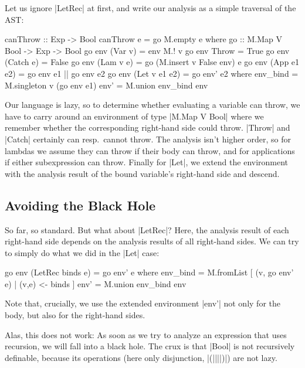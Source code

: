 \documentclass[manuscript,screen,acmsmall,nonacm]{acmart}
\begin{document}
Let us ignore |LetRec| at first, and write our analysis as a simple traversal of the AST:
\savecolumns
\begin{code}
canThrow :: Exp -> Bool
canThrow e = go M.empty e
  where
    go :: M.Map V Bool -> Exp -> Bool
    go env (Var v)        = env M.! v
    go env Throw          = True
    go env (Catch e)      = False
    go env (Lam v e)      = go (M.insert v False env) e
    go env (App e1 e2)    = go env e1 || go env e2
    go env (Let v e1 e2)  = go env' e2
      where
        env_bind  = M.singleton v (go env e1)
        env'      = M.union env_bind env
\end{code}

Our language is lazy, so to determine whether evaluating a variable can throw,
we have to carry around an
environment of type |M.Map V Bool| where we remember whether the corresponding right-hand side could throw. |Throw| and |Catch| certainly can resp.\ cannot throw. The analysis isn't higher order, so for lambdas we assume they can throw if their body can throw, and for applications if either subexpression can throw. Finally for |Let|, we extend the environment with the analysis result of the bound variable's right-hand side and descend.

\subsection{Avoiding the Black Hole}
So far, so standard. But what about |LetRec|? Here, the analysis result of each right-hand side depends on the analysis results of all right-hand sides. We can try to simply do what we did in the |Let| case:
\restorecolumns
\begin{code}
    go env (LetRec binds e) = go env' e
      where
        env_bind  = M.fromList [ (v, go env' e) | (v,e) <- binds ]
        env'      = M.union env_bind env
\end{code}
Note that, crucially, we use the extended environment |env'| not only for the body, but also for the right-hand sides.

Alas, this does not work: As soon as we try to analyze an expression that uses recursion, we will fall into a black hole. The crux is that |Bool| is not recursively definable, because its operations (here only disjunction, |(||||)|) are not lazy.

\pagebreak
\end{document}
